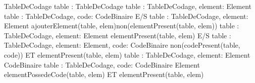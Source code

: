 	{}{TableDeCodage}
	{table : TableDeCodage}{\boolean}
	{table : TableDeCodage, element: Element}{\booleen}
	{table : TableDeCodage, code: CodeBinaire }{\booleen}
	{E/S table : TableDeCodage, element: Element}
	{ajouterElement(table, elem)}{non(elementPresent(table, elem))}
	{table : TableDeCodage, element: Element}{\booleen}
	{elementPresent(table, elem)}
	{E/S table : TableDeCodage, element: Element, code: CodeBinaire}
	{non(codePresent(table, code)) ET elementPresent(table, elem)}
	{table : TableDeCodage, element: Element }{CodeBinaire}
	{table : TableDeCodage, code: CodeBinaire }{Element}
	{elementPossedeCode(table, elem) ET elementPresent(table, elem)}

